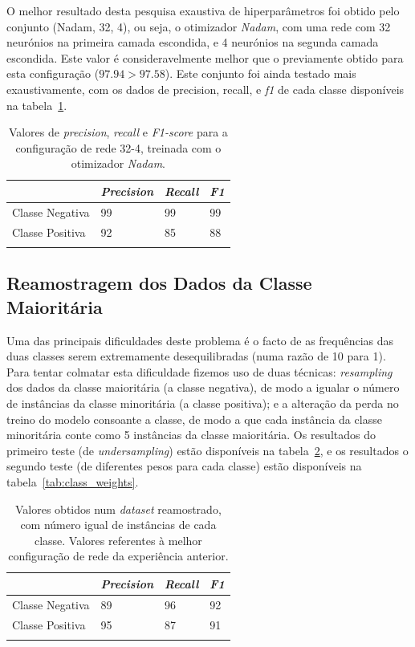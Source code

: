 \documentclass[]{article}
\begin{document}
O melhor resultado  desta pesquisa exaustiva de hiperparâmetros foi obtido pelo conjunto (Nadam, 32, 4), ou seja, o otimizador \textit{Nadam}, com uma rede com 32 neurónios na primeira camada escondida, e 4 neurónios na segunda camada escondida. Este valor é consideravelmente melhor que o previamente obtido para esta configuração ($97.94 > 97.58$). Este conjunto foi ainda testado mais exaustivamente, com os dados de precision, recall, e \textit{f1} de cada classe disponíveis na tabela~\ref{tab:nadam_32_4}.

\begin{table}[h!]
\centering
  \begin{tabular}{llll}
  \hline
   				  & \textit{Precision} & \textit{Recall} & \textit{F1} \\ \hline
  Classe Negativa & 99			   & 99			 & 99   \\
  Classe Positiva & 92			   & 85			 & 88    \\ \hline \\
\end{tabular}
  \caption{Valores de \textit{precision}, \textit{recall} e \textit{F1-score} para a configuração de rede 32-4, treinada com o otimizador \textit{Nadam}.}
  \label{tab:nadam_32_4}
\end{table}



\subsection{Reamostragem dos Dados da Classe Maioritária}
\label{sec:undersampling_class_weights}
Uma das principais dificuldades deste problema é o facto de as frequências das duas classes serem extremamente desequilibradas (numa razão de 10 para 1). Para tentar colmatar esta dificuldade fizemos uso de duas técnicas: \textit{resampling} dos dados da classe maioritária (a classe negativa), de modo a igualar o número de instâncias da classe minoritária (a classe positiva); e a alteração da perda no treino do modelo consoante a classe, de modo a que cada instância da classe minoritária conte como 5 instâncias da classe maioritária. Os resultados do primeiro teste (de \textit{undersampling}) estão disponíveis na tabela~\ref{tab:undersampling}, e os resultados o segundo teste (de diferentes pesos para cada classe) estão disponíveis na tabela~\ref{tab:class_weights}.

\begin{table}[h!]
\centering
  \begin{tabular}{llll}
  \hline
   				  & \textit{Precision} & \textit{Recall} & \textit{F1} \\ \hline
  Classe Negativa & 89			   & 96			 & 92   \\
  Classe Positiva & 95			   & 87			 & 91    \\ \hline \\
\end{tabular}
  \caption{Valores obtidos num \textit{dataset} reamostrado, com número igual de instâncias de cada classe. Valores referentes à melhor configuração de rede da experiência anterior.}
  \label{tab:undersampling}
\end{table}
\end{document}
